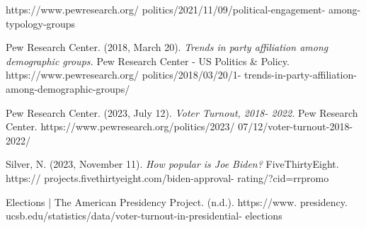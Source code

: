 \documentclass[titlepage, 12pt, leqno]{article} %
\begin{document}
\begin{enumerate}[label={[\arabic*]}]
        https://www.pewresearch.org/ politics/2021/11/09/political-engagement-
        among-typology-groups
    \item Pew Research Center. (2018, March 20). \textit{Trends in party 
        affiliation among demographic groups.} Pew Research Center - US Politics 
        \& Policy. https://www.pewresearch.org/ politics/2018/03/20/1-
        trends-in-party-affiliation-among-demographic-groups/ 
    \item Pew Research Center. (2023, July 12). \textit{Voter Turnout, 2018-
        2022.} Pew Research Center. https://www.pewresearch.org/politics/2023/
        07/12/voter-turnout-2018-2022/
    \item Silver, N. (2023, November 11). \textit{How popular is Joe Biden?}
        FiveThirtyEight. https:// projects.fivethirtyeight.com/biden-approval-
        rating/?cid=rrpromo
    \item Elections | The American Presidency Project. (n.d.). https://www.
        presidency. ucsb.edu/statistics/data/voter-turnout-in-presidential-
        elections
\end{enumerate}
\end{document}
